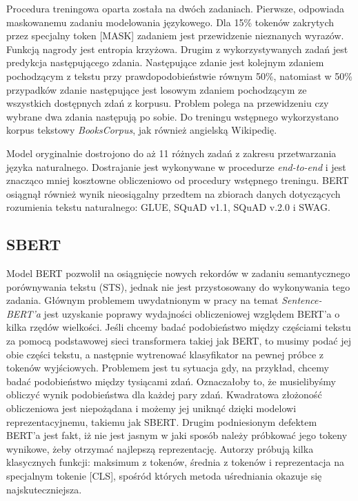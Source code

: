 Procedura treningowa oparta została na dwóch zadaniach. Pierwsze, odpowiada maskowanemu zadaniu modelowania językowego. Dla 15\% tokenów zakrytych przez specjalny token [MASK] zadaniem jest przewidzenie nieznanych wyrazów. Funkcją nagrody jest entropia krzyżowa. Drugim z wykorzystywanych zadań jest predykcja następującego zdania. Następujące zdanie jest kolejnym zdaniem pochodzącym z tekstu przy prawdopodobieństwie równym 50\%, natomiast w 50\% przypadków zdanie następujące jest losowym zdaniem pochodzącym ze wszystkich dostępnych zdań z korpusu. Problem polega na przewidzeniu czy wybrane dwa zdania następują po sobie. Do treningu wstępnego wykorzystano korpus tekstowy \emph{BooksCorpus}, jak również angielską Wikipedię.\newline

Model oryginalnie dostrojono do aż 11 różnych zadań z zakresu przetwarzania języka naturalnego. Dostrajanie jest wykonywane w procedurze \emph{end-to-end} i jest znacząco mniej kosztowne obliczeniowo od procedury wstępnego treningu. BERT osiągnął również wynik nieosiągalny przedtem na zbiorach danych dotyczących rozumienia tekstu naturalnego: GLUE, SQuAD v1.1, SQuAD v.2.0 i SWAG.\autocite{devlin2018bert}\newline

\subsection{SBERT}

Model BERT pozwolił na osiągnięcie nowych rekordów w zadaniu semantycznego porównywania tekstu (STS), jednak nie jest przystosowany do wykonywania tego zadania. Głównym problemem uwydatnionym w pracy na temat \emph{Sentence-BERT'a} jest uzyskanie poprawy wydajności obliczeniowej względem BERT'a o kilka rzędów wielkości. Jeśli chcemy badać podobieństwo między częściami tekstu za pomocą podstawowej sieci transformera takiej jak BERT, to musimy podać jej obie części tekstu, a następnie wytrenować klasyfikator na pewnej próbce z tokenów wyjściowych. Problemem jest tu sytuacja gdy, na przykład, chcemy badać podobieństwo między tysiącami zdań. Oznaczałoby to, że musielibyśmy obliczyć wynik podobieństwa dla każdej pary zdań. Kwadratowa złożoność obliczeniowa jest niepożądana i możemy jej uniknąć dzięki modelowi reprezentacyjnemu, takiemu jak SBERT. Drugim podniesionym defektem BERT'a jest fakt, iż nie jest jasnym w jaki sposób należy próbkować jego tokeny wynikowe, żeby otrzymać najlepszą reprezentację. Autorzy próbują kilka klasycznych funkcji: maksimum z tokenów, średnia z tokenów i reprezentacja na specjalnym tokenie [CLS], spośród których metoda uśredniania okazuje się najskuteczniejsza.\autocite{reimers2019sentence}\newline

